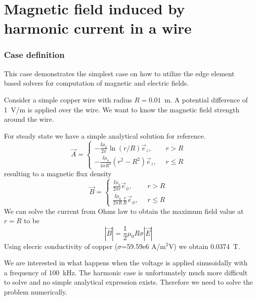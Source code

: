 \chapter{Magnetic field induced by harmonic current in a wire}



\subsection*{Case definition}

This case demonstrates the simplest case on how to utilize the edge element based solvers
for computation of magnetic and electric fields.

Consider a simple copper wire with radius $R=0.01$~m. A potential difference of 1~V/m is applied
over the wire. We want to know the magnetic field strength around the wire.  

For steady state we have a simple analytical solution for reference.
\begin{equation}
\vec{A} = \left \{
\begin{array}{ll}
  -\frac{I\mu_0}{2\pi}\ln (r/R) \vec{e}_z, & \, \, \, r > R \\
  -\frac{I\mu_0}{4\pi R^2 } (r^2 - R^2) \vec{e}_z, & \, \, \, r \leq R 
\end{array}  
\right .
\end{equation}
resulting to a magnetic flux density
\begin{equation}
\vec{B} = \left \{
\begin{array}{ll}
  \frac{I\mu_0}{2\pi r}\vec{e}_\phi, & \, \, \, r > R \\
  \frac{I\mu_0}{2\pi R}\frac{r}{R}\vec{e}_\phi, & \, \, \, r \leq R 
\end{array}  
\right .
\end{equation}
We can solve the current from Ohms law to obtain the maximum field value at $r=R$ to be
\begin{equation}
  | \vec{B} | = \frac{1}{2} \mu_0 R \sigma | \vec{E} |   
\end{equation}
Using elecric conductivity of copper ($\sigma$=59.59e6 A/m$^2$V) we obtain 0.0374~T.

We are interested in what happens when the voltage is applied sinusoidally with a frequency of 100~kHz.
The harmonic case is unfortunately much more difficult to solve and no simple analytical expression exists.
Therefore we need to solve the problem numerically. 


